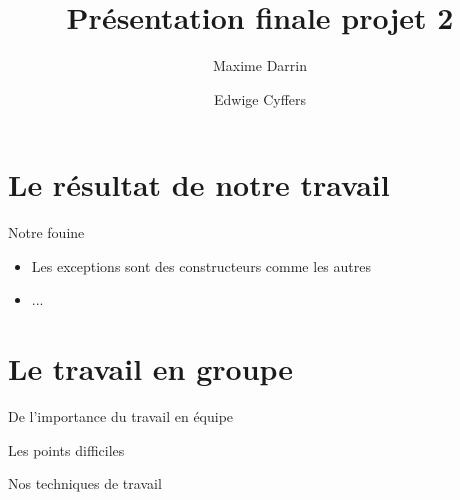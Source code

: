\documentclass{beamer}
\title{Présentation finale projet 2}
\author{Maxime Darrin  \and Edwige Cyffers }
\institute{}
\date{}
\begin{document}
\maketitle

\section{Le résultat de notre travail}

\begin{frame}{Notre fouine}

  \begin{itemize}
  \item Les exceptions sont des constructeurs comme les autres
  
  \item ...

  \end{itemize}
  
\end{frame}

\section{Le travail en groupe}

\begin{frame}{De l'importance du travail en équipe}  
\end{frame}

\begin{frame}{Les points difficiles}
	
\end{frame}

\begin{frame}{Nos techniques de travail}

\end{frame}
\end{document}
